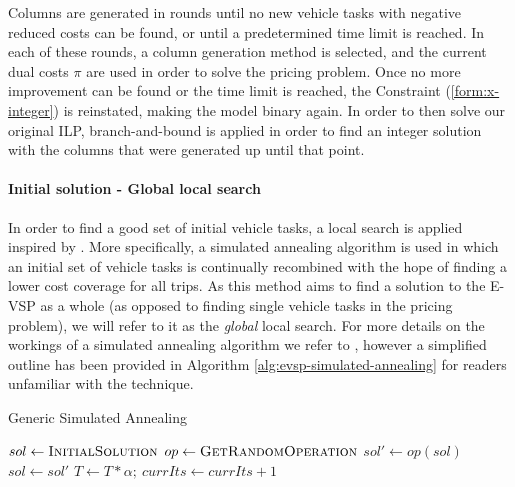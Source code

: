 \documentclass[]{article}
\begin{document}
Columns are generated in rounds until no new vehicle tasks with negative reduced costs can be found, or until a predetermined time limit is reached. In each of these rounds, a column generation method is selected, and the current dual costs $\pi$ are used in order to solve the pricing problem. Once no more improvement can be found or the time limit is reached, the Constraint (\ref{form:x-integer}) is reinstated, making the model binary again. In order to then solve our original ILP, branch-and-bound is applied in order to find an integer solution with the columns that were generated up until that point.

\paragraph{Initial solution - Global local search} \label{sec:evsp-initial-local-search}
In order to find a good set of initial vehicle tasks, a local search is applied inspired by \citet{Bosch21}. More specifically, a simulated annealing algorithm is used in which an initial set of vehicle tasks is continually recombined with the hope of finding a lower cost coverage for all trips. As this method aims to find a solution to the E-VSP as a whole (as opposed to finding single vehicle tasks in the pricing problem), we will refer to it as the \emph{global} local search. For more details on the workings of a simulated annealing algorithm we refer to \citet{Kirk83}, however a simplified outline has been provided in Algorithm \ref{alg:evsp-simulated-annealing} for readers unfamiliar with the technique.

\begin{algorithm}
\caption{Generic Simulated Annealing}\label{alg:evsp-simulated-annealing}
\begin{algorithmic}
\State $sol \gets \Call{InitialSolution}{}$
    \State $op \gets \Call{GetRandomOperation}{}$
    \State $sol' \gets op(sol)$
      $sol \gets sol'$
    \EndIf
    \State $T \gets T * \alpha;\:currIts \gets currIts + 1$
\EndWhile
\end{algorithmic}
\end{algorithm}
\end{document}
